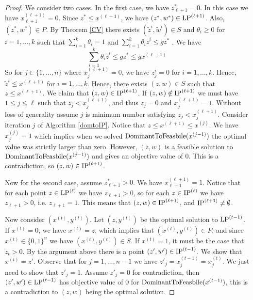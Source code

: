 \documentclass[runningheads]{llncs}
\begin{document}
\begin{proof}
	We consider two cases. In the first case, we have $z^*_{\ell+1}=0$. In this case we have $x^{(\ell+1)}_{\ell+1}=0$. Since $z^*\leq x^{(\ell+1)}$, we have $(z^*,w^*)\in \operatorname{LP}^{(\ell+1)}$. Also, $(z^*,w^*)\in P$. By Theorem \ref{CV} there exists $(\tilde{z}^i,\tilde{w}^i)\in S$ and $\theta_i\geq 0$ for $i=1,\ldots,k$ such that $\sum_{i=1}^{k} \theta_i = 1$ and  $\sum_{i=1}^{k}\theta_i \tilde{z}^i \leq gz^*$ . We have
	\begin{equation}
	\sum_{i=1}^{k}\theta_i \tilde{z}^i \leq gz^*\leq gx^{(\ell+1)}
	\end{equation}
	So for $j\in \{1,\ldots,n\}$ where $x^{(\ell+1)}_j=0$, we have $z^i_j=0$ for $i=1,\ldots,k$. Hence, $\tilde{z}^i\leq x^{(\ell+1)}$ for $i=1,\ldots,k$. Hence, there exists $(z,w)\in S$ such that $z\leq x^{(\ell+1)}$. We claim that $(z,w)\in \operatorname{IP}^{(\ell+1)}$. If $(z,w)\notin \operatorname{IP}^{(\ell+1)}$ we must have $1\leq j \leq \ell$ such that $z_j < x^{(\ell+1)}_{j}$, and thus $z_j = 0$ and $x^{(\ell+1)}_j=1$. Without loss of generality assume $j$ is minimum number satisfying $z_j < x^{(\ell+1)}_{j}$. Consider iteration $j$ of Algorithm \ref{domtoIP}. Notice that $z\leq x^{(\ell+1)}\leq x^{(j)}$. We have $x^{(j)}_j=1$ which implies when we solved $\operatorname{DominantToFeasbile}(x^{(j-1)})$ the optimal value was strictly larger than zero. However, $(z,w)$ is a feasible solution to $\operatorname{DominantToFeasbile}(x^{(j-1)})$ and gives an objective value of 0. This is a contradiction, so $(z,w)\in \operatorname{IP}^{(\ell+1)}$.
	
	Now for the second case, assume $z^*_{\ell+1} > 0$. We have $x^{(\ell+1)}_{\ell+1}=1$. Notice that for each point $z\in \operatorname{LP}^{(\ell)}$ we have $z_{\ell+1} >0$, so for each $z\in \operatorname{IP}^{(\ell)}$ we have $z_{\ell+1}>0$, i.e. $z_{\ell+1}=1$. This means that $(z,w)\in \operatorname{IP}^{(\ell+1)}$, and $\operatorname{IP}^{(\ell+1)} \neq \emptyset$.
	
	Now consider $(x^{(t)},y^{(t)})$. Let $(z,y^{(t)})$ be the optimal solution to $\operatorname{LP}^{(t-1)}$. If $x^{(t)} = 0$, we have $x^{(t)} = z$, which implies that $(x^{(t)},y^{(t)})\in P$, and since $x^{(t)}\in \{0,1\}^n$ we have $(x^{(t)},y^{(t)})\in S$. If $x^{(t)} =1$, it must be the case that $z_t > 0$. By the argument above there is a point $(z',w')\in \operatorname{IP}^{(t-1)}$. We show that $x^{(t)} = z'$. Observe that for $j=1,\ldots,n-1$ we have $z'_j= x_j^{(t-1)}=x_j^{(t)}$. We just need to show that $z'_j = 1$. Assume $z'_j = 0$ for contradiction, then $(z',w')\in \operatorname{LP}^{(t-1)}$ has objective value of $0$ for $\operatorname{DominantToFeasbile}(x^{(t-1)})$, this is a contradiction to $(z,w)$ being the optimal solution.
\end{proof}
\end{document}
